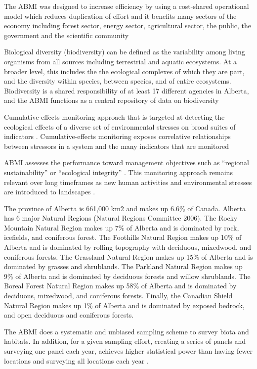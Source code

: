 \documentclass[12pt,oneside]{book}
\begin{document}
The ABMI was designed to increase efficiency by using a cost-shared
operational model which reduces duplication of effort and it benefits
many sectors of the economy including forest sector, energy sector,
agricultural sector, the public, the government and the scientific
community

Biological diversity (biodiversity) can be defined as the variability
among living organisms from all sources including terrestrial and
aquatic ecosystems.  At a broader level, this includes the the
ecological complexes of which they are part, and the diversity within
species, between species, and of entire ecosystems.  Biodiversity is a
shared responsibility of at least 17 different agencies in Alberta,
and the ABMI functions as a central repository of data on biodiversity

Cumulative-effects monitoring approach that is targeted at detecting
the ecological effects of a diverse set of environmental stresses on
broad suites of indicators \cite{manley04}. Cumulative-effects
monitoring exposes correlative relationships between stressors in a
system and the many indicators that are monitored \cite{thornton94}

ABMI assesses the performance toward management objectives such as
``regional sustainability'' or ``ecological integrity''
\cite{mulder99}. This monitoring approach remains relevant over long
timeframes as new human activities and environmental stresses are
introduced to landscapes \cite{watson04}.

The province of Alberta is 661,000 km2 and makes up 6.6\% of
Canada. Alberta has 6 major Natural Regions (Natural Regions Committee
2006). The Rocky Mountain Natural Region makes up 7\% of Alberta and
is dominated by rock, icefields, and coniferous forest. The Foothills
Natural Region makes up 10\% of Alberta and is dominated by rolling
topography with deciduous, mixedwood, and coniferous forests. The
Grassland Natural Region makes up 15\% of Alberta and is dominated by
grasses and shrublands. The Parkland Natural Region makes up 9\% of
Alberta and is dominated by deciduous forests and willow
shrublands. The Boreal Forest Natural Region makes up 58\% of Alberta
and is dominated by deciduous, mixedwood, and coniferous
forests. Finally, the Canadian Shield Natural Region makes up 1\% of
Alberta and is dominated by exposed bedrock, and open deciduous and
coniferous forests.

The ABMI does a systematic and unbiased sampling scheme to survey
biota and habitats.  In addition, for a given sampling effort,
creating a series of panels and surveying one panel each year,
achieves higher statistical power than having fewer locations and
surveying all locations each year \cite{urquhart98} \cite{urquhart99}.
\end{document}
